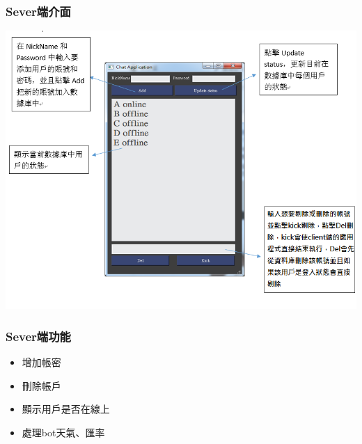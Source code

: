 \documentclass[utf8x]{beamer}
\begin{document}
\begin{frame}
\frametitle{\huge Sever端介面} %
\hspace{3.5cm} \includegraphics[scale=0.4]{serverui}
\end{frame}

\begin{frame}[t]
\frametitle{\huge Sever端功能} %
\begin{itemize}
\Large \item 增加帳密
\item 刪除帳戶
\item 顯示用戶是否在線上
\item 處理bot天氣、匯率
\end{itemize}
\end{frame}
\end{document}

